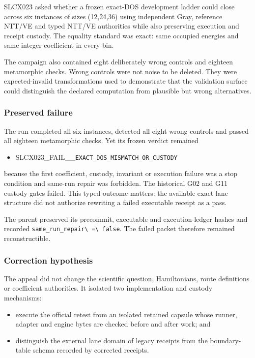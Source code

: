 SLCX023 asked whether a frozen exact-DOS development ladder could close
across six instances of sizes (12,24,36) using independent Gray,
reference NTT/VE and typed NTT/VE authorities while also preserving
execution and receipt custody. The equality standard was exact: same
occupied energies and same integer coefficient in every bin.

The campaign also contained eight deliberately wrong controls and
eighteen metamorphic checks. Wrong controls were not noise to be
deleted. They were expected-invalid transformations used to demonstrate
that the validation surface could distinguish the declared computation
from plausible but wrong alternatives.

\subsubsection{Preserved failure}\label{viii-ch03-preserved-failure}

The run completed all six instances, detected all eight wrong controls
and passed all eighteen metamorphic checks. Yet its frozen verdict
remained

\begin{itemize}
\tightlist
\item
  SLCX023\_FAIL\_\_\nolinkurl{EXACT_DOS_MISMATCH_OR_CUSTODY}
\end{itemize}

because the first coefficient, custody, invariant or execution failure
was a stop condition and same-run repair was forbidden. The historical
G02 and G11 custody gates failed. This typed outcome matters: the
available exact lane structure did not authorize rewriting a failed
executable receipt as a pass.

The parent preserved its precommit, executable and execution-ledger
hashes and recorded \nolinkurl{same_run_repair\ =\ false}. The failed
packet therefore remained reconstructible.

\subsubsection{Correction hypothesis}\label{viii-ch03-correction-hypothesis}

The appeal did not change the scientific question, Hamiltonians, route
definitions or coefficient authorities. It isolated two implementation
and custody mechanisms:

\begin{itemize}
\tightlist
\item
  execute the official retest from an isolated retained capsule whose
  runner, adapter and engine bytes are checked before and after work;
  and
\item
  distinguish the external lane domain of legacy receipts from the
  boundary-table schema recorded by corrected receipts.
\end{itemize}

